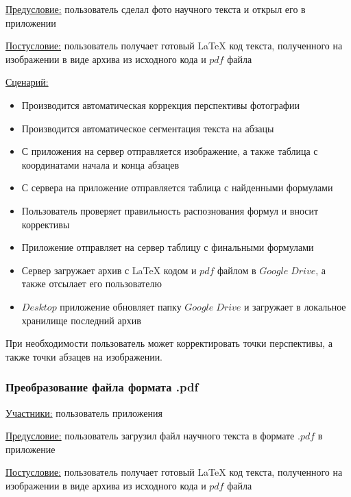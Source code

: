\underline{Предусловие:} пользователь сделал фото научного текста и открыл его в приложении

\underline{Постусловие:} пользователь получает готовый \LaTeX\; код текста, полученного на изображении в виде архива из исходного кода и $pdf$ файла

\underline{Сценарий:}
\begin{itemize}
    \item Производится автоматическая коррекция перспективы фотографии
    \item Производится автоматическое сегментация текста на абзацы
    \item С приложения на сервер отправляется изображение, а также таблица с координатами начала и конца абзацев
    \item С сервера на приложение отправляется таблица с найденными формулами
    \item Пользователь проверяет правильность распознования формул и вносит коррективы
    \item Приложение отправляет на сервер таблицу с финальными формулами
    \item Сервер загружает архив с \LaTeX\; кодом и $pdf$ файлом в $Google\;Drive$, а также отсылает его пользователю
    \item $Desktop$ приложение обновляет папку $Google\;Drive$ и загружает в локальное хранилище последний архив
\end{itemize}

При необходимости пользователь может корректировать точки перспективы, а также точки абзацев на изображении.

\subsubsection{Преобразование файла формата .pdf}
\underline{Участники:} пользователь приложения

\underline{Предусловие:} пользователь загрузил файл научного текста в формате $.pdf$ в приложение

\underline{Постусловие:} пользователь получает готовый \LaTeX\; код текста, полученного на изображении в виде архива из исходного кода и $pdf$ файла

